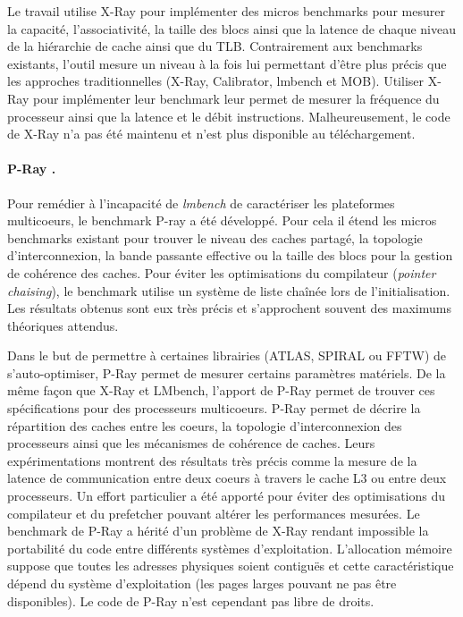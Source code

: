              Le travail \cite{Yotov2005} utilise X-Ray pour implémenter des micros benchmarks pour mesurer la capacité, l'associativité, la taille des blocs ainsi que la latence de chaque niveau de la hiérarchie de cache ainsi que du TLB. Contrairement aux benchmarks existants, l'outil mesure un niveau à la fois lui permettant d'être plus précis que les approches traditionnelles (X-Ray, Calibrator, lmbench et MOB). Utiliser X-Ray pour implémenter leur benchmark leur permet de mesurer la fréquence du processeur ainsi que la latence et le débit instructions. Malheureusement, le code de X-Ray n'a pas été maintenu et n'est plus disponible au téléchargement.
        
        \paragraph{P-Ray \cite{Duchateau2008}.} 
        
             
            Pour remédier à l'incapacité de \textit{lmbench} de caractériser les plateformes multicoeurs, le benchmark P-ray a été développé. Pour cela il étend les micros benchmarks existant pour trouver le niveau des caches partagé, la topologie d’interconnexion, la bande passante effective ou la taille des blocs pour la gestion de cohérence des caches. Pour éviter les optimisations du compilateur (\textit{pointer chaising}), le benchmark utilise un système de liste chaînée lors de l'initialisation. Les résultats obtenus sont eux très précis et s'approchent souvent des maximums théoriques attendus.

            Dans le but de permettre à certaines librairies (ATLAS, SPIRAL ou FFTW) de s'auto-optimiser, P-Ray permet de mesurer certains paramètres matériels. De la même façon que X-Ray et LMbench, l'apport de P-Ray permet de trouver ces spécifications pour des processeurs multicoeurs. P-Ray permet de décrire la répartition des caches entre les coeurs, la topologie d'interconnexion des processeurs ainsi que les mécanismes de cohérence de caches. Leurs expérimentations montrent des résultats très précis comme la mesure de la latence de communication entre deux coeurs à travers le cache L3 ou entre deux processeurs. Un effort particulier a été apporté pour éviter des optimisations du compilateur et du prefetcher pouvant altérer les performances mesurées. Le benchmark de P-Ray a hérité d'un problème de X-Ray rendant impossible la portabilité du code entre différents systèmes d'exploitation. L'allocation mémoire suppose que toutes les adresses physiques soient contiguës et cette caractéristique dépend du système d'exploitation (les pages larges pouvant ne pas être disponibles). Le code de P-Ray n'est cependant pas libre de droits.
        
